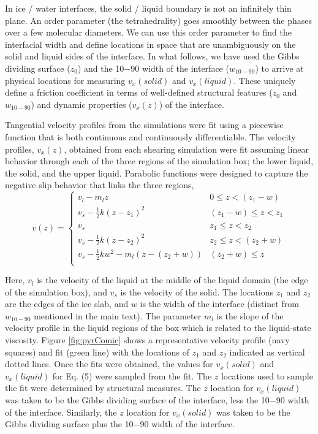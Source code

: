 In ice / water interfaces, the solid / liquid boundary is not
an infinitely thin plane. An order parameter (the tetrahedrality) goes
smoothly between the phases over a few molecular diameters.  We can
use this order parameter to find the interfacial width and define
locations in space that are unambiguously on the solid and liquid
sides of the interface.  In what follows, we have used the Gibbs
dividing surface ($z_0$) and the 10$-$90 width of the interface
($w_\mathrm{10-90}$) to arrive at physical locations for measuring
$v_{x}(solid)$ and $v_{x}(liquid)$.  These uniquely define a friction
coefficient in terms of well-defined structural features ($z_0$ and
$w_\mathrm{10-90}$) and dynamic properties ($v_{x}(z)$) of the
interface.

Tangential velocity profiles from the simulations were fit using a
piecewise function that is both continuous and continuously
differentiable. The velocity profiles, $v_x(z)$, obtained from each
shearing simulation were fit assuming linear behavior through each of
the three regions of the simulation box; the lower liquid, the solid,
and the upper liquid. Parabolic functions were designed to capture the
negative slip behavior that links the three regions,
\begin{equation}\label{vfit}
v(z) =
\begin{cases}
  v_{l} - m_{l}z & 0 \leq z < (z_{1} - w) \\
  v_{s} - \frac{1}{2}k(z-z_{1})^{2} & (z_{1}-w) \leq z < z_{1} \\
  v_{s}  & z_{1} \leq z < z_{2} \\
  v_{s} - \frac{1}{2}k(z-z_{2})^{2}  & z_{2} \leq z <( z_{2} + w)\\
  v_{s} - \frac{1}{2}kw^{2} - m_{l}(z-(z_{2} + w)) & (z_{2} + w) \leq z \\
\end{cases}
\end{equation}
  
Here, $v_{l}$ is the velocity of the liquid at the middle of the
liquid domain (the edge of the simulation box), and $v_{s}$ is the
velocity of the solid. The locations $z_{1}$ and $z_{2}$ are the edges
of the ice slab, and $w$ is the width of the interface (distinct from
$w_{10-90}$ mentioned in the main text). The parameter $m_{l}$ is the
slope of the velocity profile in the liquid regions of the box which
is related to the liquid-state viscosity. Figure \ref{fig:pyrComic}
shows a representative velocity profile (navy squares) and fit (green
line) with the locations of $z_{1}$ and $z_{2}$ indicated as vertical
dotted lines. Once the fits were obtained, the values for
$v_{x}(solid)$ and $v_{x}(liquid)$ for Eq. (5) were sampled from the
fit. The $z$ locations used to sample the fit were determined by
structural measures. The $z$ location for $v_{x}(liquid)$ was taken to
be the Gibbs dividing surface of the interface, less the 10$-$90 width
of the interface. Similarly, the $z$ location for $v_{x}(solid)$ was
taken to be the Gibbs dividing surface plus the 10$-$90 width of the
interface.


